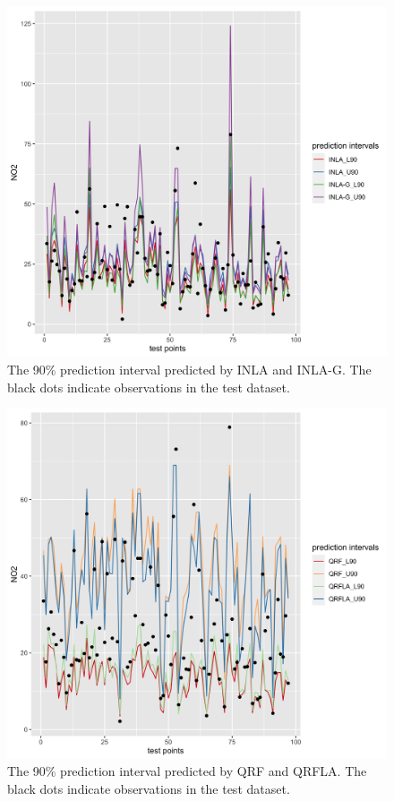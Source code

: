 \documentclass{article}
\begin{document}
\begin{figure}
\centering
\includegraphics[scale = 0.2]{fig/INLA_pred.png}

\caption{The 90\% prediction interval predicted by INLA and INLA-G. The black dots indicate observations in the test dataset.}
\label{inlapred}
\end{figure}

\begin{figure}
\centering
\includegraphics[scale = 0.2]{fig/qrf_qrfla.png}
\caption{The 90\% prediction interval predicted by QRF and QRFLA. The black dots indicate observations in the test dataset.}
\label{qrrfla}
\end{figure}
\end{document}

